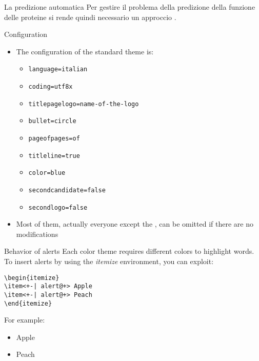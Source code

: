 \documentclass{beamer}
\begin{document}
\begin{tframe}{La predizione automatica}
Per gestire il problema della predizione della funzione delle proteine si rende quindi necessario un approccio .

\end{tframe}


\begin{frame}[t,fragile]{Configuration}
\begin{itemize}
\item The configuration of the standard theme is:
\begin{itemize}
\item \verb!language=italian!
\item \verb!coding=utf8x!
\item \verb!titlepagelogo=name-of-the-logo!
\item \verb!bullet=circle!
\item \verb!pageofpages=of!
\item \verb!titleline=true!
\item \verb!color=blue!
\item \verb!secondcandidate=false!
\item \verb!secondlogo=false!
\end{itemize}
\item Most of them, actually everyone except the , can be omitted if there are no modifications
\end{itemize}
\end{frame}

\begin{frame}[fragile]{Behavior of alerts}
Each color theme requires different colors to highlight words. To insert alerts by using the \emph{itemize} environment, you can exploit:
\begin{verbatim}
\begin{itemize}
\item<+-| alert@+> Apple
\item<+-| alert@+> Peach
\end{itemize}
\end{verbatim}
For example:
\begin{itemize}
\item<+-| alert@+> Apple
\item<+-| alert@+> Peach
\end{itemize}
\end{frame}
\end{document}
